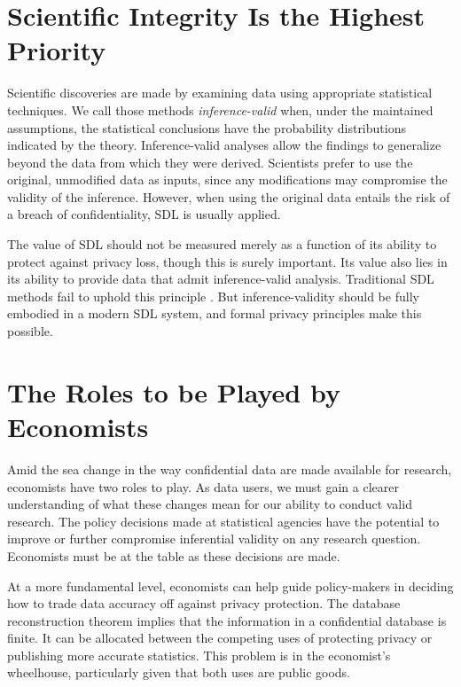 \documentclass[finalmode,PP]{AEA}
\begin{document}
\section{Scientific Integrity Is the Highest Priority}

Scientific discoveries are made by examining data using appropriate statistical techniques. We call those methods \emph{inference-valid} when, under the maintained assumptions, the statistical conclusions have the probability distributions indicated by the theory. Inference-valid analyses allow the findings to generalize beyond the data from which they were derived. Scientists prefer to use the original, unmodified data as inputs, since any modifications may compromise the validity of the inference. However, when using the original data entails the risk of a breach of confidentiality, \ac{SDL} is usually applied.

The value of \ac{SDL} should not be measured merely as a function of its ability to protect against privacy loss, though this is surely important. Its value also lies in its ability to provide data that admit inference-valid analysis. Traditional \ac{SDL} methods fail to uphold this principle \citep{abowd:schmutte:BPEA:2015}.
But inference-validity should be fully embodied in a modern \ac{SDL} system, and formal privacy principles make this possible.

\section{The Roles to be Played by Economists}

Amid the sea change in the way confidential data are made available for research, economists have two roles to play. As data users, we must gain a clearer understanding of what these changes mean for our ability to conduct valid research. The policy decisions made at statistical agencies have the potential to improve or further compromise inferential validity on any research question. Economists must be at the table as these decisions are made.

At a more fundamental level, economists can help guide policy-makers in deciding how to trade data accuracy off against privacy protection. The database reconstruction theorem implies that the information in a confidential database is finite. It can be allocated between the competing uses of protecting privacy or publishing more accurate statistics. This problem is in the economist's wheelhouse, particularly given that both uses are public goods.
\end{document}
